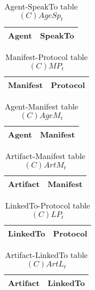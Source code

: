 \begin{table}[H]
	\centering
	\begin{tabular}{|p{4cm}|p{8cm}|}
			\hline
			\textbf{Agent} & \textbf{SpeakTo} \\
			\hline
			\hline
		\end{tabular}
	\caption{Agent-SpeakTo table $(C)AgeSp_t$}
	\label{tab:cagespt}
\end{table}

\begin{table}[H]
	\centering
	\begin{tabular}{|p{4cm}|p{8cm}|}
			\hline
			\textbf{Manifest} & \textbf{Protocol} \\
			\hline
			\hline
		\end{tabular}
	\caption{Manifest-Protocol table $(C)MP_t$}
	\label{tab:cmpt}
\end{table}

\begin{table}[H]
	\centering
	\begin{tabular}{|p{4cm}|p{8cm}|}
			\hline
			\textbf{Agent} & \textbf{Manifest} \\
			\hline
			\hline
		\end{tabular}
	\caption{Agent-Manifest table $(C)AgeM_t$}
	\label{tab:cagemt}
\end{table}

\begin{table}[H]
	\centering
	\begin{tabular}{|p{4cm}|p{8cm}|}
			\hline
			\textbf{Artifact} & \textbf{Manifest} \\
			\hline
			\hline
		\end{tabular}
	\caption{Artifact-Manifest table $(C)ArtM_t$}
	\label{tab:cartmt}
\end{table}

\begin{table}[H]
	\centering
	\begin{tabular}{|p{4cm}|p{8cm}|}
			\hline
			\textbf{LinkedTo} & \textbf{Protocol} \\
			\hline
			\hline
		\end{tabular}
	\caption{LinkedTo-Protocol table $(C)LP_t$}
	\label{tab:clpt}
\end{table}

\begin{table}[H]
	\centering
	\begin{tabular}{|p{4cm}|p{8cm}|}
			\hline
			\textbf{Artifact} & \textbf{LinkedTo} \\
			\hline
			\hline
		\end{tabular}
	\caption{Artifact-LinkedTo table $(C)ArtL_t$}
	\label{tab:cartlt}
\end{table}

